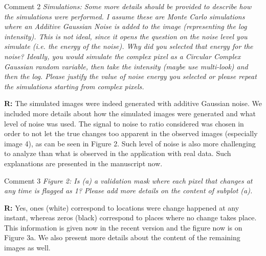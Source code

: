 \documentclass[11pt]{report}
\begin{document}
\medskip
\begin{mybox}{Comment 2}
\textit{Simulations: Some more details should be provided to describe how the simulations were performed. I assume these are Monte Carlo simulations where an Additive Gaussian Noise is added to the image (representing
the log intensity). This is not ideal, since it opens the question on the noise level you simulate (i.e. the energy
of the noise). Why did you selected that energy for the noise? Ideally, you would simulate the complex pixel
as a Circular Complex Gaussian random variable, then take the intensity (maybe use multi-look) and then the
log. Please justify the value of noise energy you selected or please repeat the simulations starting from complex
pixels.}


\medskip
\textbf{R:} The simulated images were indeed generated with additive Gaussian noise. We included more details about how the simulated images were generated and what level of noise was used. The signal to noise to ratio considered was chosen in order to not let the true changes too apparent in the observed images (especially image 4), as can be seen in Figure 2. Such level of noise is also more challenging to analyze than what is observed in the application with real data. Such explanations are presented in the manuscript now.   
\end{mybox}

\medskip
\begin{mybox}{Comment 3}
\textit{Figure 2: Is (a) a validation mask where each pixel that changes at any time is flagged as 1? Please add
more details on the content of subplot (a).}


\medskip
\textbf{R:} Yes, ones (white) correspond to locations were change happened at any instant, whereas zeros (black) correspond to places where no change takes place.  This information is given now in the recent version and the figure now is on Figure 3a. We also present more details about the content of the remaining images as well.
\end{mybox}
\end{document}

